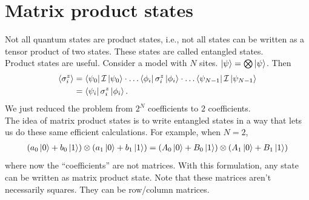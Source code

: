 \documentclass{book}
\theoremstyle{definition}
\newcommand{\nn}{\nonumber}
\newcommand{\la}{\langle}
\newcommand{\ra}{\rangle}
\newcommand{\Id}{\mathcal{I}}
\begin{document}
\section{Matrix product states}

Not all quantum states are product states, i.e., not all states can be written as a tensor product of two states. These states are called entangled states. \\

Product states are useful.  Consider a model with $N$ sites. $\ket{\psi} = \bigotimes \ket{\psi}$. Then 
\begin{align}
\la \sigma^z_i \ra &= \bra{\psi_0}\Id \ket{\psi_0} \cdot \dots \bra{\phi_i}\sigma^z_i\ket{\phi_i}\cdot \dots \bra{\psi_{N-1}}\Id \ket{\psi_{N-1}}\nn\\
&= \bra{\psi_i}\sigma^z_i \ket{\phi_i}.
\end{align}
We just reduced the problem from $2^N$ coefficients to $2$ coefficients. \\

The idea of matrix product states is to write entangled states in a way that lets us do these same efficient calculations. For example, when $N=2$, 
\begin{align}
(a_0 \ket{0} + b_0 \ket{1})\otimes (a_1\ket{0} + b_1\ket{1}) = (A_0 \ket{0} + B_0 \ket{1})\otimes (A_1\ket{0} + B_1\ket{1})
\end{align}
where now the ``coefficients'' are not matrices. With this formulation, any state can be written as matrix product state. Note that these matrices aren't necessarily squares. They can be row/column matrices. 






%
%
%
%
%
%
%
%
%
%
%
%
%
%
%
%
%
%
%
%
\end{document}

